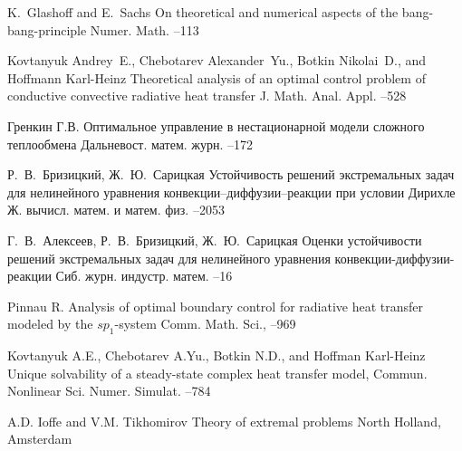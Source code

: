 \documentclass[10pt]{article}
\begin{document}
\begin{thebibliography}{10}
        \by K.~Glashoff and E.~Sachs
        \paper On theoretical and numerical aspects of the bang-bang-principle
        \jour Numer. Math.
        –113

        \by Kovtanyuk Andrey~E., Chebotarev Alexander~Yu., Botkin Nikolai~D., and Hoffmann Karl-Heinz
        \paper Theoretical analysis of an optimal control problem of conductive convective radiative heat transfer
        \jour J. Math. Anal. Appl.
        –528

        \by Гренкин Г.В.
        \paper  Оптимальное управление в нестационарной модели сложного теплообмена
        \jour Дальневост. матем. журн.
        –172

        \by Р.~В.~Бризицкий, Ж.~Ю.~Сарицкая
        \paper Устойчивость решений экстремальных задач для нелинейного уравнения конвекции–диффузии–реакции при условии Дирихле
        \jour Ж. вычисл. матем. и матем. физ.
        --2053

        \by Г.~В.~Алексеев, Р.~В.~Бризицкий, Ж.~Ю.~Сарицкая
        \paper Оценки устойчивости решений экстремальных задач для нелинейного уравнения конвекции-диффузии-реакции
        \jour Сиб. журн. индустр. матем.
        --16

        \by Pinnau R.
        \paper Analysis of optimal boundary control for radiative heat transfer modeled by the $sp_1$-system
        \jour Comm. Math. Sci.,
        –969

        \by Kovtanyuk A.E., Chebotarev A.Yu., Botkin N.D., and Hoffman Karl-Heinz
        \paper Unique solvability of a steady-state complex heat transfer model,
        \jour Commun. Nonlinear Sci. Numer. Simulat.
        –784

        \by A.D. Ioffe and V.M. Tikhomirov
        \book Theory of extremal problems
        \publaddr North Holland, Amsterdam

    \end{thebibliography}

    \EndArticle
\end{document}
